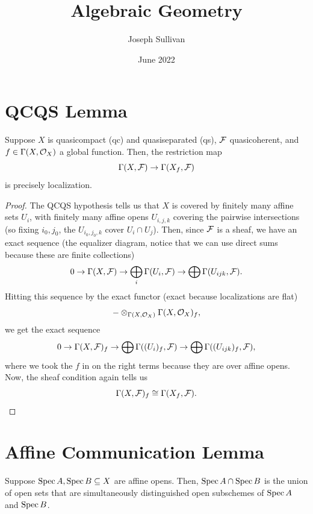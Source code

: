 \documentclass[12pt]{article}
\title{Algebraic Geometry}
\author{Joseph Sullivan}
\date{June 2022}
\begin{document}
\maketitle

\section{QCQS Lemma}

\begin{prop}
    Suppose $X$ is quasicompact (qc) and quasiseparated (qs), $\mathcal{F}$ quasicoherent, and $f\in \Gamma(X,\mathcal{O}_X)$ a global function. Then, the restriction map
    \[\Gamma(X,\mathcal{F}) \to \Gamma(X_f, \mathcal{F})\]
    is precisely localization.
\end{prop}

\begin{proof}
    The QCQS hypothesis tells us that $X$ is covered by finitely many affine sets $U_i$, with finitely many affine opens $U_{i,j,k}$ covering the pairwise intersections (so fixing $i_0,j_0$, the $U_{i_0,j_0,k}$ cover $U_i\cap U_j$). Then, since $\mathcal{F}$ is a sheaf, we have an exact sequence (the equalizer diagram, notice that we can use direct sums because these are finite collections)
    \[0 \to \Gamma(X,\mathcal{F}) \to \bigoplus_i \Gamma(U_i, \mathcal{F}) \to \bigoplus \Gamma(U_{ijk}, \mathcal{F}).\]
    Hitting this sequence by the exact functor (exact because localizations are flat)
    \[- \otimes_{\Gamma(X,\mathcal{O}_X)} \Gamma(X,\mathcal{O}_X)_f,\]
    we get the exact sequence
    \[0 \to \Gamma(X,\mathcal{F})_f \to \bigoplus \Gamma((U_i)_f, \mathcal{F}) \to \bigoplus \Gamma((U_{ijk})_f, \mathcal{F}),\]
    where we took the $f$ in on the right terms because they are over affine opens. Now, the sheaf condition again tells us
    \[\Gamma(X,\mathcal{F})_f \cong \Gamma(X_f, \mathcal{F}).\]
\end{proof}

\section{Affine Communication Lemma}

\begin{prop}
    Suppose $\operatorname{Spec} A, \operatorname{Spec} B\subseteq X$ are affine opens. Then, $\operatorname{Spec} A \cap \operatorname{Spec} B$ is the union of open sets that are simultaneously distinguished open subschemes of $\operatorname{Spec} A$ and $\operatorname{Spec} B$.
\end{prop}
\end{document}
